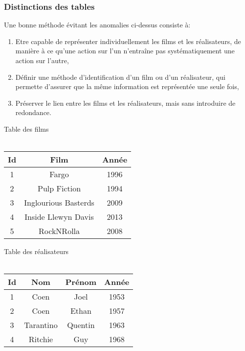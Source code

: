 \begin{frame}[fragile]
\frametitle{Distinctions des tables}

Une bonne méthode évitant les anomalies ci-dessus consiste à:
\begin{enumerate}
 \item Etre capable de représenter individuellement les films et les réalisateurs, de manière à ce qu'une action sur l'un n'entraîne pas systématiquement une action sur l'autre,
 \item Définir une méthode d'identification d'un film ou d'un réalisateur, qui permette d'assurer que la même information est représentée une seule fois,
 \item Préserver le lien entre les films et les réalisateurs, mais sans introduire de redondance.
\end{enumerate}

\begin{minipage}[t]{0.45\linewidth}
\begin{center}
Table des films \\ ~\ \\
\begin{tabular}{|c|c|c|}
\hline
\textbf{Id} & \textbf{Film} & \textbf{Année} \\
\hline
1 & Fargo & 1996 \\
\hline
2 & Pulp Fiction & 1994 \\
\hline
3 & Inglourious Basterds & 2009 \\
\hline
4 & Inside Llewyn Davis & 2013 \\
\hline
5 & RockNRolla & 2008 \\
\hline
\end{tabular}
\end{center}
\end{minipage}
\begin{minipage}[t]{0.45\linewidth}
\begin{center}
Table des réalisateurs \\ ~\ \\
\begin{tabular}{|c|c|c|c|}
\hline
\textbf{Id} & \textbf{Nom} & \textbf{Prénom} & \textbf{Année} \\
\hline
1 & Coen & Joel & 1953 \\
\hline
2 & Coen & Ethan & 1957 \\
\hline
3 & Tarantino & Quentin & 1963 \\
\hline
4 & Ritchie & Guy & 1968 \\
\hline
\end{tabular}
\end{center}
\end{minipage}
\end{frame}

